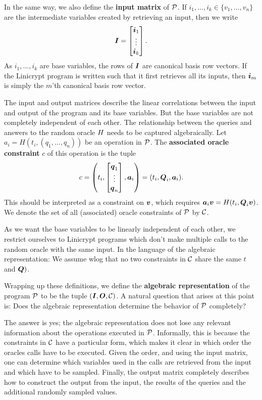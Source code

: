 In the same way, we also define the \textbf{input matrix} of $\P$.
If $i_1, \dots, i_k \in \{v_1, \dots, v_n\}$ are the intermediate variables created by retrieving an input,
then we write
\[
  \Inp = \begin{bmatrix}
  \v i_1 \\
  \vdots \\
  \v i_k
  \end{bmatrix}.
\]
As $i_1, \dots, i_k$ are base variables,
the rows of $\Inp$ are canonical basis row vectors.
If the Linicrypt program is written such that it first retrieves all its inputs,
then $\vi_m$ is simply the $m$'th canonical basis row vector. 

The input and output matrices describe the linear correlations between the input and output of the program and its base variables.
But the base variables are not completely independent of each other.
The relationship between the queries and answers to the random oracle $\H$ needs to be captured algebraically.
Let $a_i = H(t_i, (q_1, \dots, q_n))$ be an operation in $\P$.
The \textbf{associated oracle constraint} $c$ of this operation is the tuple
\[
  c = \left( t_i, \begin{bmatrix}
  \v q_1 \\
  \vdots \\
  \v q_n
  \end{bmatrix},
  \va_i \right)
	=
	(t_i, \Q_i, \va_i)
	.
\]
This should be interpreted as a constraint on $\vbase$, which requires
$\va_i \vbase = \H( t_i, \Q_i \vbase)$.
We denote the set of all (associated) oracle constraints of $\P$ by $\C$.

As we want the base variables to be linearly independent of each other,
we restrict ourselves to Linicrypt programs which don't make multiple calls to the random oracle with the same input.
In the language of the algebraic representation:
We assume wlog that no two constraints in $\C$ share the same $t$ and $\Q)$.

Wrapping up these definitions,
we define the \textbf{algebraic representation} of the program $\P$ to be the tuple $(\Inp, \O, \C)$.
A natural question that arises at this point is:
Does the algebraic representation determine the behavior of $\P$ completely?

The answer is yes; the algebraic representation does not lose any relevant information about the operations executed in $\P$.
Informally, this is because the constraints in $\C$ have a particular form, which makes it clear in which order the oracles calls have to be executed.
Given the order, and using the input matrix, one can determine which variables used in the calls are retrieved from the input and which have to be sampled.
Finally, the output matrix completely describes how to construct the output from the input,
the results of the queries and the additional randomly sampled values. 

